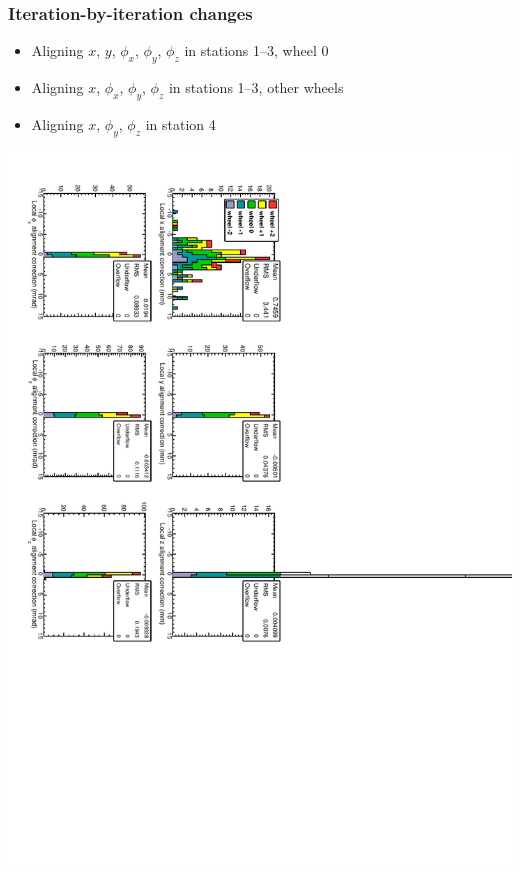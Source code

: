 \documentclass[compress]{beamer}
\begin{document}
\begin{frame}
\frametitle{Iteration-by-iteration changes}

\begin{itemize}
\item Aligning $x$, $y$, $\phi_x$, $\phi_y$, $\phi_z$ in stations 1--3, wheel 0
\item Aligning $x$, $\phi_x$, $\phi_y$, $\phi_z$ in stations 1--3, other wheels
\item Aligning $x$, $\phi_y$, $\phi_z$ in station 4
\end{itemize}

\vfill
\includegraphics[height=\linewidth, angle=90]{data_100GeV_newinternal_iter2.pdf}
\end{frame}
\end{document}

